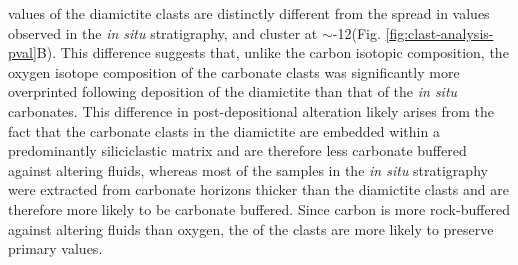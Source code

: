 \dO values of the diamictite clasts are distinctly different from the spread in values observed in the \textit{in situ} stratigraphy, and cluster at $\sim$-12\permil (Fig. \ref{fig:clast-analysis-pval}B). This difference suggests that, unlike the carbon isotopic composition, the oxygen isotope composition of the carbonate clasts was significantly more overprinted following deposition of the diamictite than that of the \textit{in situ} carbonates. This difference in post-depositional alteration likely arises from the fact that the carbonate clasts in the diamictite are embedded within a predominantly siliciclastic matrix and are therefore less carbonate buffered against altering fluids, whereas most of the samples in the \textit{in situ} stratigraphy were extracted from carbonate horizons thicker than the diamictite clasts and are therefore more likely to be carbonate buffered. Since carbon is more rock-buffered against altering fluids than oxygen, the \dC of the clasts are more likely to preserve primary values.

